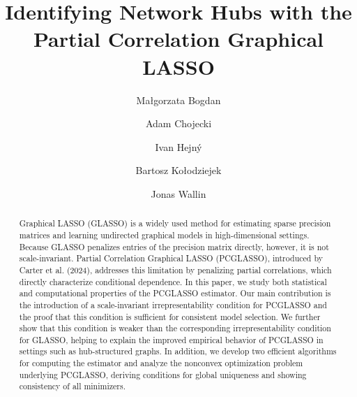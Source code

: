 \documentclass[12pt]{amsart}
\title[Identifying Network Hubs with the Partial Correlation Graphical LASSO]{Identifying Network Hubs with the Partial Correlation Graphical LASSO}
\author[M. Bogdan]{Ma{\l}gorzata Bogdan}
\author[A. Chojecki]{Adam Chojecki
\orcidlink{0009-0008-2902-4096}}
\author[I. Hejný]{Ivan Hejný}
\author[B. Kołodziejek]{Bartosz Kołodziejek \orcidlink{0000-0002-5220-9012}}
\author[J. Wallin]{Jonas Wallin}
\numberwithin{equation}{section}
\numberwithin{equation}{section}
\theoremstyle{plain}
\theoremstyle{definition}
\begin{document}
\begin{abstract}


Graphical LASSO (GLASSO) is a widely used method for estimating sparse precision matrices and learning undirected graphical models in high-dimensional settings. Because GLASSO penalizes entries of the precision matrix directly, however, it is not scale-invariant. Partial Correlation Graphical LASSO (PCGLASSO), introduced by Carter et al. (2024), addresses this limitation by penalizing partial correlations, which directly characterize conditional dependence. In this paper, we study both statistical and computational properties of the PCGLASSO estimator. Our main contribution is the introduction of a scale-invariant irrepresentability condition for PCGLASSO and the proof that this condition is sufficient for consistent model selection. We further show that this condition is weaker than the corresponding irrepresentability condition for GLASSO, helping to explain the improved empirical behavior of PCGLASSO in settings such as hub-structured graphs. In addition, we develop two efficient algorithms for computing the estimator and analyze the nonconvex optimization problem underlying PCGLASSO, deriving conditions for global uniqueness and showing consistency of all minimizers.%
\end{abstract}
\end{document}
